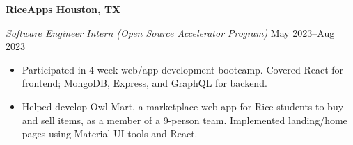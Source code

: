 \textbf{RiceApps \hfill Houston, TX}\par
\textit{Software Engineer Intern (Open Source Accelerator Program)} \hfill May 2023--Aug 2023

\begin{itemize}
	\item Participated in 4-week web/app development bootcamp. Covered React for frontend; MongoDB, Express, and GraphQL for backend.
    \item Helped develop Owl Mart, a marketplace web app for Rice students to buy and sell items, as a member of a 9-person team. Implemented landing/home pages using Material UI tools and React.
\end{itemize}\par